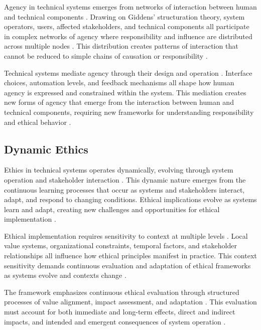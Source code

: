 \documentclass[12pt]{article}
\begin{document}
Agency in technical systems emerges from networks of interaction between human and technical components \parencite{latour2005}. Drawing on Giddens' \parencite{giddens1984} structuration theory, system operators, users, affected stakeholders, and technical components all participate in complex networks of agency where responsibility and influence are distributed across multiple nodes \parencite{floridi2018}. This distribution creates patterns of interaction that cannot be reduced to simple chains of causation or responsibility \parencite{johnson2005}.

Technical systems mediate agency through their design and operation \parencite{verbeek2011}. Interface choices, automation levels, and feedback mechanisms all shape how human agency is expressed and constrained within the system. This mediation creates new forms of agency that emerge from the interaction between human and technical components, requiring new frameworks for understanding responsibility and ethical behavior \parencite{mittelstadt2016}.

\subsection{Dynamic Ethics}

Ethics in technical systems operates dynamically, evolving through system operation and stakeholder interaction \parencite{dewey1922}. This dynamic nature emerges from the continuous learning processes that occur as systems and stakeholders interact, adapt, and respond to changing conditions. Ethical implications evolve as systems learn and adapt, creating new challenges and opportunities for ethical implementation \parencite{floridi2018}.

Ethical implementation requires sensitivity to context at multiple levels \parencite{nissenbaum2010}. Local value systems, organizational constraints, temporal factors, and stakeholder relationships all influence how ethical principles manifest in practice. This context sensitivity demands continuous evaluation and adaptation of ethical frameworks as systems evolve and contexts change \parencite{friedman2019}.

The framework emphasizes continuous ethical evaluation through structured processes of value alignment, impact assessment, and adaptation \parencite{kearns2019}. This evaluation must account for both immediate and long-term effects, direct and indirect impacts, and intended and emergent consequences of system operation \parencite{yeung2018}.
\end{document}
